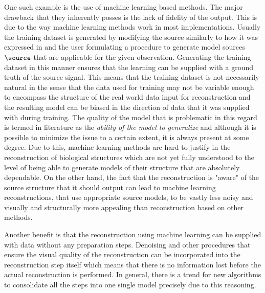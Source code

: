 One such example is the use of machine learning based methods.
The major drawback that they inherently posses is the lack of fidelity of the output.
This is due to the way machine learning methods work in most implementations.
Usually the training dataset is generated by modifying the source similarly to how it was expressed in 
     and the user formulating a procedure to generate model sources \(\source\) that are
    applicable for the given observation.
Generating the training dataset in this manner ensures that the learning can be supplied with a ground truth of the
    source signal.
This means that the training dataset is not necessarily natural in the sense that the data used for training may not be
    variable enough to encompass the structure of the real world data input for reconstruction and the resulting
    model can be biased in the direction of data that it was supplied with during training.
The quality of the model that is problematic in this regard is termed in literature as the \emph{ability of the model to
    generalize} and although it is possible to minimize the issue to a certain extent, it is always present at some 
    degree.
Due to this, machine learning methods are hard to justify in the reconstruction of biological structures which are not 
    yet fully understood to the level of being able to generate models of their structure that are absolutely 
    dependable.
On the other hand, the fact that the reconstruction is "aware" of the source structure that it should output can lead to
    machine learning reconstructions, that use appropriate source models, to be vastly less noisy and visually and 
    structurally more appealing than reconstruction based on other methods.

Another benefit is that the reconstruction using machine learning can be supplied with data without any preparation
    steps.
Denoising and other procedures that ensure the visual quality of the reconstruction can be incorporated into the
    reconstruction step itself which means that there is no information lost before the actual reconstruction is 
    performed.
In general, there is a trend for new algorithms to consolidate all the steps into one single model precisely due to this
    reasoning.

